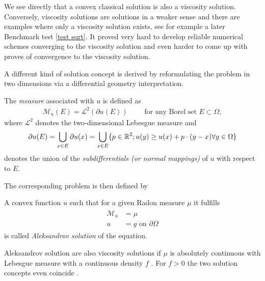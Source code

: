 We see directly that a convex classical solution is also a viscosity solution. Conversely, viscosity solutions are solutions in a weaker sense and there are examples where only a viscosity solution exists, see for example a later Benchmark test \ref{test sqrt}.
It proved very hard to develop reliable numerical schemes converging to the viscosity solution and even harder to come up with proves of convergence to the viscosity solution.

A different kind of solution concept is derived by reformulating the \MA problem in two dimensions via a differential geometry interpretation.

\begin{definition}\label{def:MA measure}
	The \emph{\MA measure} associated with $u$ is defined as 
	\begin{align}
		\mathcal{M}_u (E) = \mathcal{L}^2(\partial u(E)) \qquad \text{ for any Borel set } E \subset \Omega,
	\end{align}
	where $\mathcal{L}^2$ denotes the two-dimensional Lebesgue measure and 
	\[
		\partial u(E) = \bigcup_{x \in E} \partial u (x) = \bigcup_{x \in E} \{p \in \mathbb{R}^2; u(y) \geq u(x) +p\cdot (y-x) \forall y \in \Omega\}
	\]
	denotes the union of the \emph{subdifferentials (or normal mappings)} of $u$ with respect to $E$.
\end{definition}
The corresponding \MA problem is then defined by

\begin{definition}\label{def:aleksandrov solution}
A convex function $u$ such that for a given Radon measure $\mu$ it fulfills
\begin{align}
\begin{split}
\mathcal M_u&= \mu \\ 
u &= g  \text{ on } \partial \Omega
\end{split}
\end{align}
is called \emph{Aleksandrov solution} of the \MA equation.
\end{definition}

Aleksandrov solution are also viscosity solutions if $\mu$ is absolutely continuous with Lebesgue measure with a continuous density $f$ \cite[proposition 1.3.4.]{Gutierrez2001} . For $f > 0$ the two solution concepts even coincide \cite[proposition 1.7.1]{Gutierrez2001}. 

